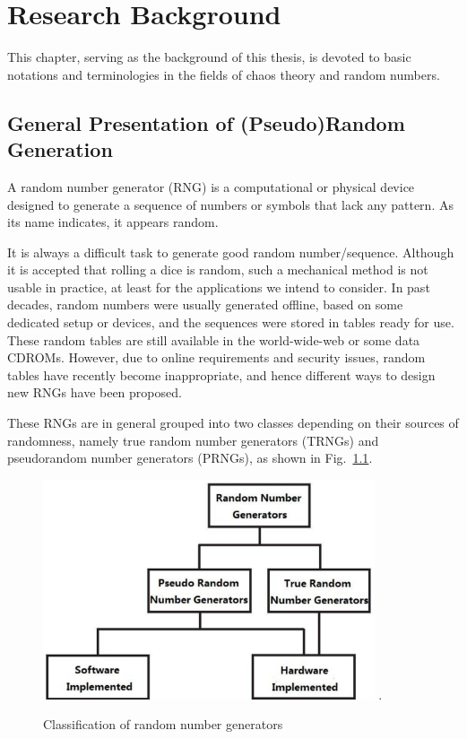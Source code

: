 \chapter{Research Background}
\label{General Notions}
\minitoc
This chapter, serving as the background of this thesis,  
is devoted to basic notations and terminologies in the fields of chaos theory and random numbers.




\section{General Presentation of (Pseudo)Random Generation}

A random number generator (RNG) is a computational or physical device designed to generate a sequence of numbers or symbols that lack any pattern. As its name indicates, it appears random.

It is always a difficult task to generate good random number/sequence. Although it is accepted that rolling a dice
is random, such a mechanical method is not 
usable in practice, at least for the applications we
intend to consider. 
In past decades, random numbers were usually  generated offline, based on some dedicated setup or devices, and the sequences were stored in tables ready for use. These random tables are still available in the world-wide-web or some data CDROMs.
However, due to online requirements and security issues, random tables have recently become inappropriate, and hence different ways to design new RNGs have been proposed.

These RNGs are in general grouped into two classes depending on their sources of randomness, namely true random number generators (TRNGs) and pseudorandom number generators (PRNGs), as shown in Fig.~\ref{Classification}. 

\begin{figure}
\centering
\includegraphics[width=3.85in]{Classification.eps}
\DeclareGraphicsExtensions.
\caption{Classification of random number generators}
\label{Classification}
\end{figure}



